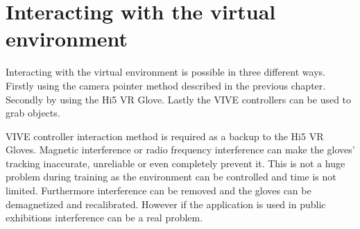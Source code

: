 \documentclass[12pt, a4paper,oneside, nocenter]{thesis}
\begin{document}
\section{Interacting with the virtual environment}
Interacting with the virtual environment is possible in three different ways. Firstly using the camera pointer method described in the previous chapter. Secondly by using the Hi5 VR Glove. Lastly the VIVE controllers can be used to grab objects.
\par
VIVE controller interaction method is required as a backup to the Hi5 VR Gloves. Magnetic interference or radio frequency interference can make the gloves' tracking inaccurate, unreliable or even completely prevent it. This is not a huge problem during training as the environment can be controlled and time is not limited. Furthermore interference can be removed and the gloves can be demagnetized and recalibrated. However if the application is used in public exhibitions interference can be a real problem.
\end{document}
